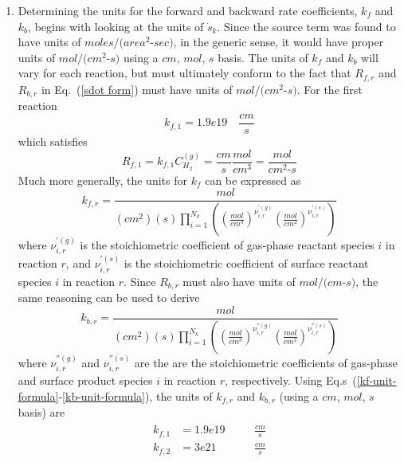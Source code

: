 \documentclass[a4paper]{report}
\newcommand{\eref}[1]{Eq.~(\ref{#1})}
\newcommand{\erefs}[2]{Eq.s~(\ref{#1}-\ref{#2})}
\newcommand{\sk}{\dot{s}_k}
\newcommand{\kf}[1]{k_{f,#1}}
\newcommand{\kb}[1]{k_{b,#1}}
\newcommand{\cg}[1]{C_{#1}^{(g)}}
\begin{document}
\begin{enumerate}
\item Determining the units for the forward and backward rate coefficients,
  $k_f$ and $k_b$, begins with looking at the units of $\sk$.  Since the source
  term was found to have units of $moles/(area^2$-$sec)$, in the generic sense, it
  would have proper units of $mol/(cm^2$-$s)$ using a $cm$, $mol$, $s$ basis.
  The units of $k_f$ and $k_b$ will vary for each reaction, but must ultimately
  conform to the fact that $R_{f,r}$ and $R_{b,r}$ in \eref{sdot form} must have
  units of $mol/(cm^2$-$s)$.  For the first reaction
  \begin{equation}
    \kf{1} = 1.9e19 \quad \frac{cm}{s}
    \label{kf_units}
  \end{equation}
  which satisfies
  \begin{equation}
    R_{f,1} = k_{f,1}\cg{H_2} = \frac{cm}{s}\frac{mol}{cm^3} =
    \frac{mol}{cm^2\text{-}s}
    \label{R_units}
  \end{equation}
 Much more generally, the units for $k_f$ can be expressed as
  \begin{equation}
    \kf{r} = \frac{mol}{(cm^2)(s)\prod_{i=1}^{N_k}\left(
    \left( \frac{mol}{cm^3} \right)^{\nu_{i,r}^{'(g)}} \left( \frac{mol}{cm^2}
    \right)^{\nu_{i,r}^{'(s)}} \right)}
    \label{kf-unit-formula}
  \end{equation}
  where $\nu_{i,r}^{'(g)}$ is the stoichiometric coefficient of gas-phase
  reactant species $i$ in reaction $r$, and $\nu_{i,r}^{'(s)}$ is the
  stoichiometric coefficient of surface reactant species $i$ in reaction $r$.
  Since $R_{b,r}$ must also have units of $mol/(cm$-$s)$, the same reasoning can
  be used to derive
  \begin{equation}
    \kb{r} = \frac{mol}{(cm^2)(s)\prod_{i=1}^{N_k}\left(
    \left( \frac{mol}{cm^3} \right)^{\nu_{i,r}^{''(g)}} \left( \frac{mol}{cm^2}
    \right)^{\nu_{i,r}^{''(s)}} \right)}
    \label{kb-unit-formula}
  \end{equation}
  where $\nu_{i,r}^{''(g)}$ and $\nu_{i,r}^{''(s)}$ are the are the
  stoichiometric coefficients of gas-phase and surface product species $i$ in
  reaction $r$, respectively.  Using \erefs{kf-unit-formula}{kb-unit-formula},
  the units of $\kf{r}$ and $\kb{r}$ (using a $cm$, $mol$, $s$ basis) are
  \begin{align}
    \begin{alignedat}{2}
      \kf{1} &= 1.9e19 && \quad \frac{cm}{s} \\
      \kf{2} &= 3e21   && \quad \frac{cm}{s} \\

\end{alignedat}
\end{align}
\end{enumerate}
\end{document}

